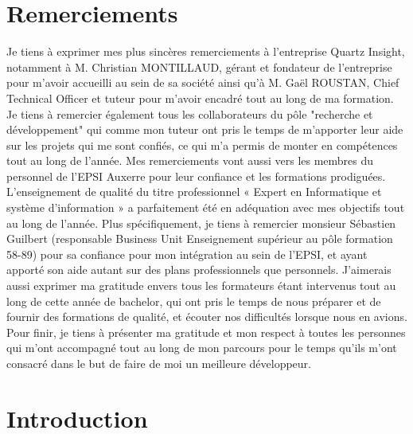 \documentclass[a4paper, 11pt]{report}
\begin{document}
\chapter{Remerciements}
Je tiens à exprimer mes plus sincères remerciements à l’entreprise Quartz Insight, notamment à M. Christian MONTILLAUD, gérant et fondateur de l’entreprise pour m'avoir accueilli au sein de sa société ainsi qu'à M. Gaël ROUSTAN, Chief Technical Officer et tuteur pour m'avoir encadré tout au long de ma formation.
Je tiens à remercier également tous les collaborateurs du pôle "recherche et développement" qui comme mon tuteur ont pris le temps de m’apporter leur aide sur les projets qui me sont confiés, ce qui m’a permis de monter en compétences tout au long de l’année.
\newline
\newline
Mes remerciements vont aussi vers les membres du personnel de l’EPSI Auxerre pour leur confiance et les formations prodiguées.
L’enseignement de qualité du titre professionnel « Expert en Informatique et système  d’information »  a parfaitement été en adéquation avec mes objectifs tout au long de l’année. 
Plus spécifiquement, je tiens à remercier monsieur Sébastien Guilbert (responsable Business Unit Enseignement supérieur au pôle formation 58-89) pour sa confiance pour mon intégration au sein de l’EPSI, et ayant apporté son aide autant sur des plans professionnels que personnels.
\newline
\newline
J’aimerais aussi exprimer ma gratitude envers tous les formateurs étant intervenus tout au long de cette année de bachelor, qui ont pris le temps de nous préparer et de fournir des formations de qualité, et écouter nos difficultés lorsque nous en avions.
\newline
\newline
Pour finir, je tiens à présenter ma gratitude et mon respect à toutes les personnes qui m'ont accompagné tout au long de mon parcours pour le temps qu'ils m'ont consacré dans le but de faire de moi un meilleure développeur.

\chapter{Introduction}
\end{document}
